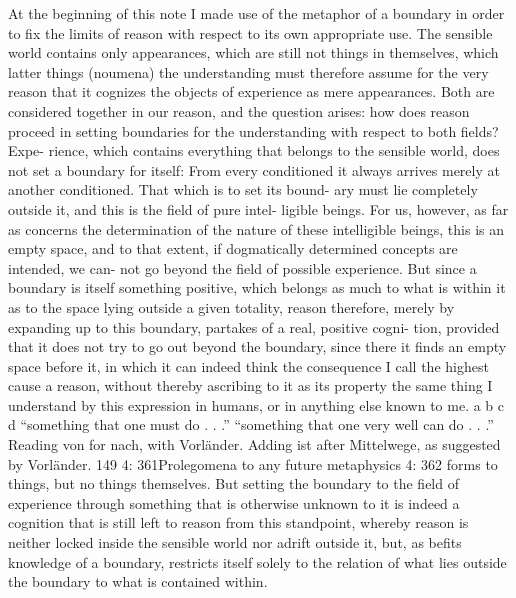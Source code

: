 At the beginning of this note I made use of the metaphor of a boundary
in order to ﬁx the limits of reason with respect to its own appropriate
use. The sensible world contains only appearances, which are still not
things in themselves, which latter things (noumena) the understanding
must therefore assume for the very reason that it cognizes the objects of
experience as mere appearances. Both are considered together in our
reason, and the question arises: how does reason proceed in setting
boundaries for the understanding with respect to both ﬁelds? Expe-
rience, which contains everything that belongs to the sensible world,
does not set a boundary for itself: From every conditioned it always
arrives merely at another conditioned. That which is to set its bound-
ary must lie completely outside it, and this is the ﬁeld of pure intel-
ligible beings. For us, however, as far as concerns the determination of
the nature of these intelligible beings, this is an empty space, and to
that extent, if dogmatically determined concepts are intended, we can-
not go beyond the ﬁeld of possible experience. But since a boundary
is itself something positive, which belongs as much to what is within it
as to the space lying outside a given totality, reason therefore, merely
by expanding up to this boundary, partakes of a real, positive cogni-
tion, provided that it does not try to go out beyond the boundary, since
there it ﬁnds an empty space before it, in which it can indeed think the
consequence I call the highest cause a reason, without thereby ascribing to it
as its property the same thing I understand by this expression in humans, or in
anything else known to me.
a
b
c
d
“something that one must do . . .”
“something that one very well can do . . .”
Reading von for nach, with Vorländer.
Adding ist after Mittelwege, as suggested by Vorländer.
149
4: 361Prolegomena to any future metaphysics
4: 362
forms to things, but no things themselves. But setting the boundary to
the ﬁeld of experience through something that is otherwise unknown to
it is indeed a cognition that is still left to reason from this standpoint,
whereby reason is neither locked inside the sensible world nor adrift
outside it, but, as beﬁts knowledge of a boundary, restricts itself solely
to the relation of what lies outside the boundary to what is contained
within.

